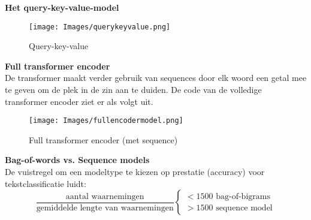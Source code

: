 {\textbf{Het query-key-value-model}\\
\begin{figure}[h]
    \centering
    \texttt{[image: Images/querykeyvalue.png]}
    \caption{Query-key-value}
    \label{fig:qkv}
\end{figure}

\textbf{Full transformer encoder}\\
De transformer maakt verder gebruik van sequences door elk woord een getal mee te geven om de plek in de zin aan te duiden. De code van de volledige transformer encoder ziet er als volgt uit.
\begin{figure}[h]
    \centering
    \texttt{[image: Images/fullencodermodel.png]}
    \caption{Full transformer encoder (met sequence)}
    \label{fig:fulltransformerencoder}
\end{figure}

\textbf{Bag-of-words vs. Sequence models}\\
De vuistregel om een modeltype te kiezen op prestatie (accuracy) voor tekstclassificatie luidt:
\[
\frac{\textrm{aantal waarnemingen}}{\textrm{gemiddelde lengte van waarnemingen}}\begin{cases}
<1500 \textrm{ bag-of-bigrams}\\
>1500 \textrm{ sequence model}
\end{cases}
\]














}
